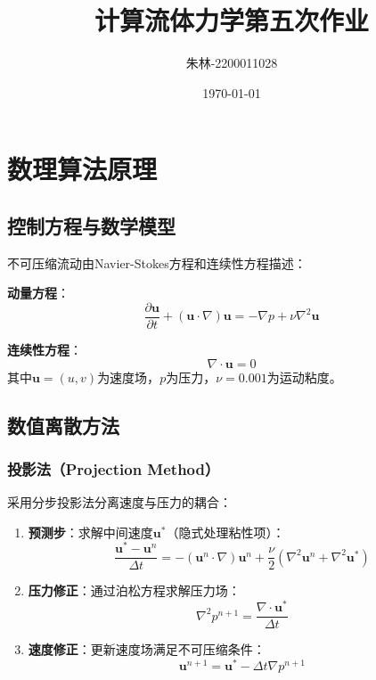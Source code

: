 \documentclass[UTF8]{ctexart}
\begin{document}
\title{计算流体力学第五次作业}
\author{朱林-2200011028}
\date{\today}
\maketitle


\section{数理算法原理}
\subsection{控制方程与数学模型}
不可压缩流动由Navier-Stokes方程和连续性方程描述：

\textbf{动量方程}：
\begin{equation}
\frac{\partial \mathbf{u}}{\partial t} + (\mathbf{u} \cdot \nabla) \mathbf{u} = -\nabla p + \nu \nabla^2 \mathbf{u}
\label{eq:momentum}
\end{equation}

\textbf{连续性方程}：
\begin{equation}
\nabla \cdot \mathbf{u} = 0
\label{eq:continuity}
\end{equation}
其中$\mathbf{u} = (u, v)$为速度场，$p$为压力，$\nu = 0.001$为运动粘度。

\subsection{数值离散方法}
\subsubsection{投影法（Projection Method）}
采用分步投影法分离速度与压力的耦合：
\begin{enumerate}
    \item \textbf{预测步}：求解中间速度$\mathbf{u}^*$（隐式处理粘性项）：
    \begin{equation}
    \frac{\mathbf{u}^* - \mathbf{u}^n}{\Delta t} = -\left(\mathbf{u}^n \cdot \nabla\right)\mathbf{u}^n + \frac{\nu}{2} \left( \nabla^2 \mathbf{u}^n + \nabla^2 \mathbf{u}^* \right)
    \label{eq:predictor}
    \end{equation}
    
    \item \textbf{压力修正}：通过泊松方程求解压力场：
    \begin{equation}
    \nabla^2 p^{n+1} = \frac{\nabla \cdot \mathbf{u}^*}{\Delta t}
    \label{eq:poisson}
    \end{equation}
    
    \item \textbf{速度修正}：更新速度场满足不可压缩条件：
    \begin{equation}
    \mathbf{u}^{n+1} = \mathbf{u}^* - \Delta t \nabla p^{n+1}
    \label{eq:corrector}
    \end{equation}
\end{enumerate}
\end{document}
